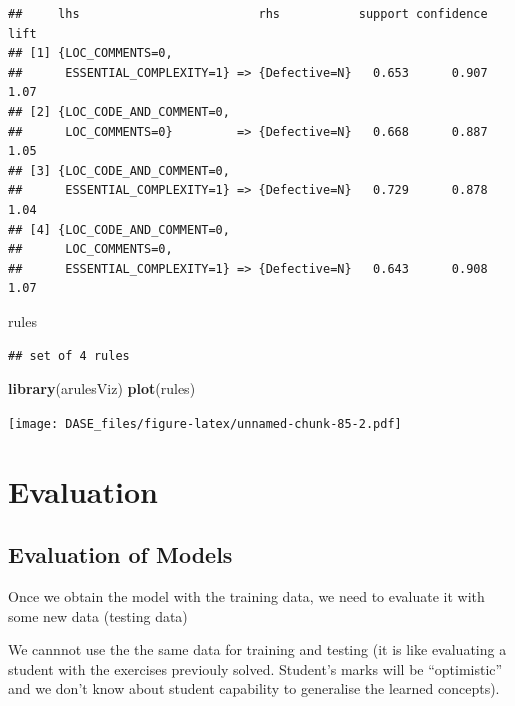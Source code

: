 \documentclass[]{book}
\newenvironment{Shaded}{\begin{snugshade}}{\end{snugshade}}
\newcommand{\KeywordTok}[1]{\textcolor[rgb]{0.13,0.29,0.53}{\textbf{{#1}}}}
\newcommand{\NormalTok}[1]{{#1}}
\begin{document}
\begin{verbatim}
##     lhs                         rhs           support confidence lift
## [1] {LOC_COMMENTS=0,                                                 
##      ESSENTIAL_COMPLEXITY=1} => {Defective=N}   0.653      0.907 1.07
## [2] {LOC_CODE_AND_COMMENT=0,                                         
##      LOC_COMMENTS=0}         => {Defective=N}   0.668      0.887 1.05
## [3] {LOC_CODE_AND_COMMENT=0,                                         
##      ESSENTIAL_COMPLEXITY=1} => {Defective=N}   0.729      0.878 1.04
## [4] {LOC_CODE_AND_COMMENT=0,                                         
##      LOC_COMMENTS=0,                                                 
##      ESSENTIAL_COMPLEXITY=1} => {Defective=N}   0.643      0.908 1.07
\end{verbatim}

\begin{Shaded}
\begin{Highlighting}[]
 \NormalTok{rules}
\end{Highlighting}
\end{Shaded}

\begin{verbatim}
## set of 4 rules
\end{verbatim}

\begin{Shaded}
\begin{Highlighting}[]
 \KeywordTok{library}\NormalTok{(arulesViz)}
 \KeywordTok{plot}\NormalTok{(rules)}
\end{Highlighting}
\end{Shaded}

\texttt{[image: DASE\_files/figure-latex/unnamed-chunk-85-2.pdf]}

\part{Evaluation}\label{part-evaluation}

\chapter{Evaluation of Models}\label{evaluation-of-models}

Once we obtain the model with the training data, we need to evaluate it
with some new data (testing data)

We cannnot use the the same data for training and testing (it is like
evaluating a student with the exercises previouly solved. Student's
marks will be ``optimistic'' and we don't know about student capability
to generalise the learned concepts).
\end{document}
